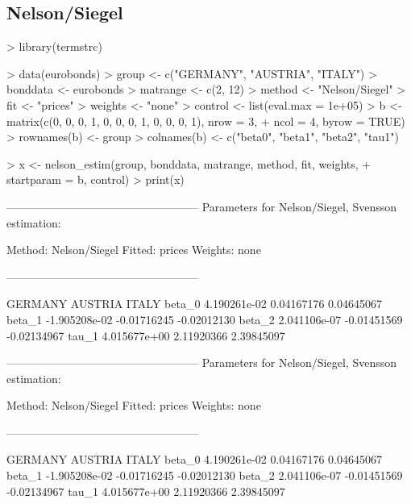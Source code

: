 \subsection{Nelson/Siegel}

\begin{Schunk}
\begin{Sinput}
> library(termstrc)
\end{Sinput}
\end{Schunk}

\begin{Schunk}
\begin{Sinput}
> data(eurobonds)
> group <- c("GERMANY", "AUSTRIA", "ITALY")
> bonddata <- eurobonds
> matrange <- c(2, 12)
> method <- "Nelson/Siegel"
> fit <- "prices"
> weights <- "none"
> control <- list(eval.max = 1e+05)
> b <- matrix(c(0, 0, 0, 1, 0, 0, 0, 1, 0, 0, 0, 1), nrow = 3, 
+     ncol = 4, byrow = TRUE)
> rownames(b) <- group
> colnames(b) <- c("beta0", "beta1", "beta2", "tau1")
\end{Sinput}
\end{Schunk}

\begin{Schunk}
\begin{Sinput}
> x <- nelson_estim(group, bonddata, matrange, method, fit, weights, 
+     startparam = b, control)
> print(x)
\end{Sinput}
\begin{Soutput}
---------------------------------------------------
Parameters for Nelson/Siegel, Svensson estimation:

Method: Nelson/Siegel 
Fitted: prices 
Weights: none 

---------------------------------------------------

             GERMANY     AUSTRIA       ITALY
beta_0  4.190261e-02  0.04167176  0.04645067
beta_1 -1.905208e-02 -0.01716245 -0.02012130
beta_2  2.041106e-07 -0.01451569 -0.02134967
tau_1   4.015677e+00  2.11920366  2.39845097

---------------------------------------------------
Parameters for Nelson/Siegel, Svensson estimation:

Method: Nelson/Siegel 
Fitted: prices 
Weights: none 

---------------------------------------------------

             GERMANY     AUSTRIA       ITALY
beta_0  4.190261e-02  0.04167176  0.04645067
beta_1 -1.905208e-02 -0.01716245 -0.02012130
beta_2  2.041106e-07 -0.01451569 -0.02134967
tau_1   4.015677e+00  2.11920366  2.39845097
\end{Soutput}
\end{Schunk}

